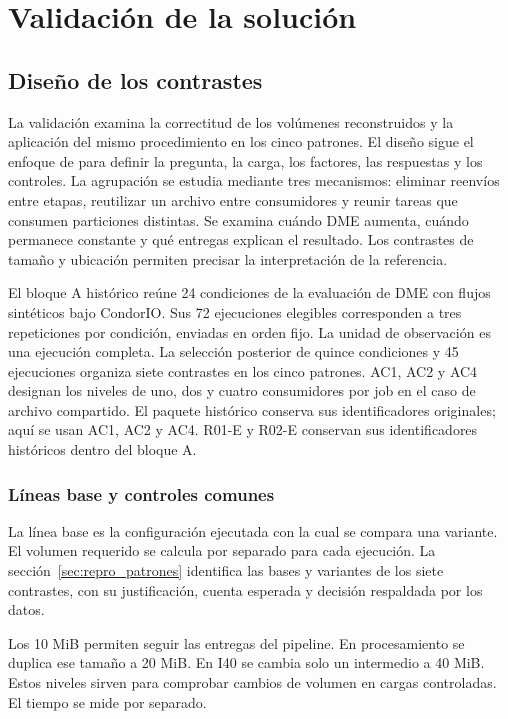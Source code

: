 \chapter{Validación de la solución}
\label{ch:validacion}
\section{Diseño de los contrastes}
La validación examina la correctitud de los volúmenes reconstruidos y la aplicación del mismo procedimiento en los cinco patrones. El diseño sigue el enfoque de \citet{jain1991} para definir la pregunta, la carga, los factores, las respuestas y los controles. La agrupación se estudia mediante tres mecanismos: eliminar reenvíos entre etapas, reutilizar un archivo entre consumidores y reunir tareas que consumen particiones distintas. Se examina cuándo DME aumenta, cuándo permanece constante y qué entregas explican el resultado. Los contrastes de tamaño y ubicación permiten precisar la interpretación de la referencia.

El bloque A histórico reúne 24 condiciones de la evaluación de DME con flujos sintéticos bajo CondorIO. Sus 72 ejecuciones elegibles corresponden a tres repeticiones por condición, enviadas en orden fijo. La unidad de observación es una ejecución completa. La selección posterior de quince condiciones y 45 ejecuciones organiza siete contrastes en los cinco patrones. AC1, AC2 y AC4 designan los niveles de uno, dos y cuatro consumidores por job en el caso de archivo compartido. El paquete histórico conserva sus identificadores originales; aquí se usan AC1, AC2 y AC4. R01-E y R02-E conservan sus identificadores históricos dentro del bloque A.



\subsection{Líneas base y controles comunes}
La línea base es la configuración ejecutada con la cual se compara una variante. El volumen requerido se calcula por separado para cada ejecución. La sección~\ref{sec:repro_patrones} identifica las bases y variantes de los siete contrastes, con su justificación, cuenta esperada y decisión respaldada por los datos.



Los 10 MiB permiten seguir las entregas del pipeline. En procesamiento se duplica ese tamaño a 20 MiB. En I40 se cambia solo un intermedio a 40 MiB. Estos niveles sirven para comprobar cambios de volumen en cargas controladas. El tiempo se mide por separado.


